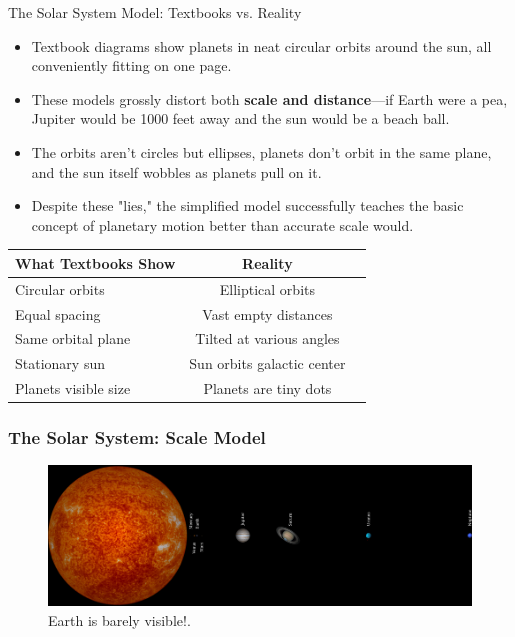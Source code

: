 \documentclass{beamer}
\begin{document}
	\begin{frame}{The Solar System Model: Textbooks vs. Reality}
		\begin{itemize}
			\item Textbook diagrams show planets in neat circular orbits around the sun, all conveniently fitting on one page.
			\item These models grossly distort both \textbf{scale and distance}—if Earth were a pea, Jupiter would be 1000 feet away and the sun would be a beach ball.
			\item The orbits aren't circles but ellipses, planets don't orbit in the same plane, and the sun itself wobbles as planets pull on it.
			\item Despite these "lies," the simplified model successfully teaches the basic concept of planetary motion better than accurate scale would.
		\end{itemize}
		
		
		\begin{table}
			\centering
			\small
			\begin{tabular}{lcc}
				\toprule
				What Textbooks Show & Reality \\
				\midrule
				Circular orbits & Elliptical orbits \\
				Equal spacing & Vast empty distances \\
				Same orbital plane & Tilted at various angles \\
				Stationary sun & Sun orbits galactic center \\
				Planets visible size & Planets are tiny dots \\
				\bottomrule
			\end{tabular}
		\end{table}
	\end{frame}
	
	\begin{frame}
		\frametitle{The Solar System: Scale Model}
		\begin{figure}
			\centering
			\includegraphics[width=\textwidth, height=0.8\textheight, keepaspectratio]{images/Solar-system.png}
			\small
			\caption{Earth is barely visible!.}
		\end{figure}
	\end{frame}
	
\end{document}
